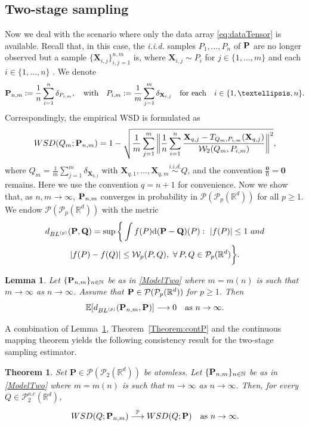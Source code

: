 \documentclass{imsart}
\newtheorem {Lemma}[Proposition] {Lemma}
\newtheorem {Theorem}[Proposition]{Theorem}
\numberwithin{equation}{section}
\def\N{\mathbb{N}}
\def\R{\mathbb{R}}
\def\E{\mathbb{E}}
\def\X{\mathbf{X}}
\def\E{\mathbb E}
\def\N{\mathbb N}
\begin{document}
\subsection{Two-stage sampling}\label{two_stg_sampling}
Now we deal with the scenario where only the data array \eqref{eq:dataTensor}  is available. Recall that, in this case, the \textit{i.i.d.}  samples  $P_1, \dots,P_n $ of ${\bf P}$ are no longer observed but a sample $\{\X_{i,j}\}_{i,j=1}^{n,m}$ is, where $\X_{i,j}\sim P_i$ for $j\in \{1, \dots, m\}$ and each $i\in \{1, \dots, n\}$ .  
We denote 
\begin{equation}
	\label{ModelTwo}
	{\bf P}_{n,m}:=\frac{1}{n}\sum_{i=1}^n \delta_{P_{i,m}}, \quad \text{with} \quad    P_{i,m}:=\frac{1}{m}\sum_{j=1}^m\delta_{\X_{i,j} }\quad \text{for each}\quad  i\in \{1, \dots, n\}.
\end{equation}
Correspondingly, the empirical WSD is formulated as 
\begin{equation*}
	{\rm WSD}(Q_m; {\bf P}_{n,m}) = 1- \sqrt{ \frac{1}{m} \sum_{j=1}^m  \bigg\| \frac{1}{n}\sum_{i=1}^n \frac{\X_{q,j}-T_{Q_m, P_{i,m}}(\X_{q,j})}{\mathcal{W}_2(Q_m, P_{i,m})} \bigg\|^2 },
\end{equation*}
where $Q_m = \frac{1}{m}\sum_{j=1}^m \delta_{\X_{q,j}}$ with $\X_{q,1} , \ldots , \X_{q,m} \stackrel{\textit{i.i.d.}}{\sim} Q$, and the convention $\frac{\mathbf{0}}{0}=\mathbf{0}$ remains.
Here we use the convention $q=n+1$ for convenience.
Now we show that, as $n,m\to \infty$, 
$   {\bf P}_{n,m} $ converges in probability in  $  \mathcal{P}(\mathcal{P}_p(\R^d)) $ for all $p\geq 1$. We endow $\mathcal{P}(\mathcal{P}_{p}(\R^d))$ with the metric 
\begin{multline*}
	d_{{\rm BL}^{(p)}}({\bf P}, {\bf Q}) = \sup\bigg\{ \int f(P)\mathrm{d}({\bf P}- {\bf Q})(P): \   |f(P)|\leq 1\ {\rm and}\\ |f(P)-f(Q) |\leq \mathcal{W}_{p}(P,Q), \ \forall \, P,Q\in \mathcal{P}_{p}(\R^d)\bigg\}.
\end{multline*}
\begin{Lemma}\label{Lemma:ConvergenceBL}
	Let $\{{\bf P}_{n,m}\}_{n\in \N}$ be as in \eqref{ModelTwo} where $m=m(n)$ is such that $m\to \infty$ as $n\to \infty$. Assume that ${\bf P}\in \mathcal{P}(\mathcal{P}_{p}(\R^d))$ for $p\geq 1$.  Then 
	$$ \E[d_{{\rm BL}^{(p)}}({\bf P}_{n,m}, {\bf P})] \longrightarrow 0 \quad \text{as } n\to \infty.$$
\end{Lemma}
A combination of Lemma~\ref{Lemma:ConvergenceBL}, Theorem~\ref{Theorem:contP} 
and the continuous mapping theorem
yields the following consistency result for the two-stage sampling estimator. 
\begin{Theorem}\label{two_stage_consistency}
	Set $\mathbf{P}\in \mathcal{P}(\mathcal{P}_{2}(\R^d)) $ be atomless. Let $\{{\bf P}_{n,m}\}_{n\in \N}$ be as in \eqref{ModelTwo} where $m=m(n)$ is such that $m\to \infty$ as $n\to \infty$. Then,   for every $Q\in \mathcal{P}^{a.c}_2(\R^d)$, 
	$$ {\rm WSD}(Q; {\bf P}_{n,m}) \overset{\mathbb{P}}{\longrightarrow}  {\rm WSD}(Q; {\bf P}) \quad \text{as } n\to \infty. $$
\end{Theorem}
\end{document}
